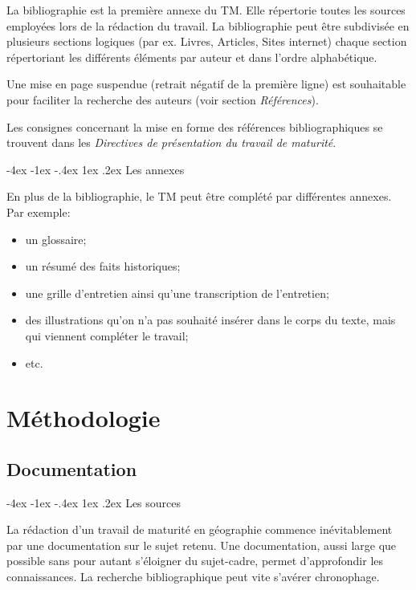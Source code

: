 \documentclass[
  a4paper,
]{book}
\makeatletter
\providecommand{\tightlist}{%
  \setlength{\itemsep}{0pt}\setlength{\parskip}{0pt}}\usepackage{longtable,booktabs,array}
\providecommand{\tightlist}{%
  \setlength{\itemsep}{0pt}\setlength{\parskip}{0pt}}
\renewcommand{\section}{\@startsection{section}{1}{\z@}
{-4ex \@plus -1ex \@minus -.4ex}
{1ex \@plus.2ex }
{\normalfont\large\sffamily\bfseries}}
\makeatother
\begin{document}
La bibliographie est la première annexe du TM. Elle répertorie toutes
les sources employées lors de la rédaction du travail. La bibliographie
peut être subdivisée en plusieurs sections logiques (par ex. Livres,
Articles, Sites internet) chaque section répertoriant les différents
éléments par auteur et dans l'ordre alphabétique.

Une mise en page suspendue (retrait négatif de la première ligne) est
souhaitable pour faciliter la recherche des auteurs (voir section
\emph{Références}).

Les consignes concernant la mise en forme des références
bibliographiques se trouvent dans les \emph{Directives de présentation
du travail de maturité}.

\hypertarget{les-annexes}{%
\section{Les annexes}\label{les-annexes}}

En plus de la bibliographie, le TM peut être complété par différentes
annexes. Par exemple:

\begin{itemize}
\tightlist
\item
  un glossaire;
\item
  un résumé des faits historiques;
\item
  une grille d'entretien ainsi qu'une transcription de l'entretien;
\item
  des illustrations qu'on n'a pas souhaité insérer dans le corps du
  texte, mais qui viennent compléter le travail;
\item
  etc.
\end{itemize}

\part{Méthodologie}

\hypertarget{documentation}{%
\chapter{Documentation}\label{documentation}}

\hypertarget{les-sources}{%
\section{Les sources}\label{les-sources}}

La rédaction d'un travail de maturité en géographie commence
inévitablement par une documentation sur le sujet retenu. Une
documentation, aussi large que possible sans pour autant s'éloigner du
sujet-cadre, permet d'approfondir les connaissances. La recherche
bibliographique peut vite s'avérer chronophage.
\end{document}

